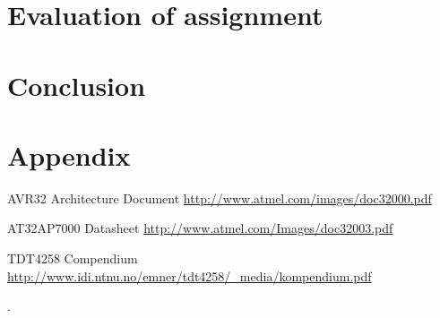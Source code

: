 \documentclass[a4paper,11pt]{article}
\begin{document}
\section{Evaluation of assignment}

\section{Conclusion}

\section{Appendix}

\footnotesize{  %
\begin{thebibliography}{N}

 AVR32 Architecture Document
\url{http://www.atmel.com/images/doc32000.pdf}

 AT32AP7000 Datasheet
\url{http://www.atmel.com/Images/doc32003.pdf}

 TDT4258 Compendium
\url{http://www.idi.ntnu.no/emner/tdt4258/_media/kompendium.pdf}

\end{thebibliography}.  
}
\end{document}
